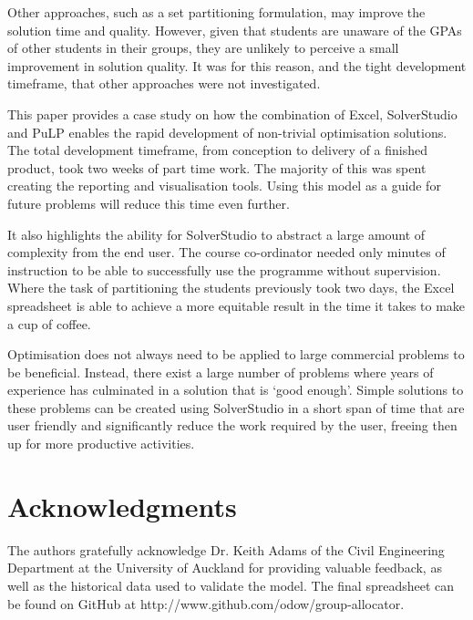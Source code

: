 \documentclass[12pt]{ORSNZ}
\begin{document}
Other approaches, such as a set partitioning formulation, may improve the solution time and quality. However, given that students are unaware of the GPAs of other students in their groups, they are unlikely to perceive a small improvement in solution quality. It was for this reason, and the tight development timeframe, that other approaches were not investigated.



This paper provides a case study on how the combination of Excel, SolverStudio and PuLP enables the rapid development of non-trivial optimisation solutions. The total development timeframe, from conception to delivery of a finished product, took two weeks of part time work. The majority of this was spent creating the reporting and visualisation tools. Using this model as a guide for future problems will reduce this time even further.

It also highlights the ability for SolverStudio to abstract a large amount of complexity from the end user. The course co-ordinator needed only minutes of instruction to be able to successfully use the programme without supervision. Where the task of partitioning the students previously took two days, the Excel spreadsheet is able to achieve a more equitable result in the time it takes to make a cup of coffee.

Optimisation does not always need to be applied to large commercial problems to be beneficial. Instead, there exist a large number of problems where years of experience has culminated in a solution that is `good enough'. Simple solutions to these problems can be created using SolverStudio in a short span of time that are user friendly and significantly reduce the work required by the user, freeing then up for more productive activities.

\section*{Acknowledgments}
The authors gratefully acknowledge Dr. Keith Adams of the Civil Engineering Department at the University of Auckland for providing valuable feedback, as well as the historical data used to validate the model. The final spreadsheet can be found on GitHub at http://www.github.com/odow/group-allocator.



\end{document}
